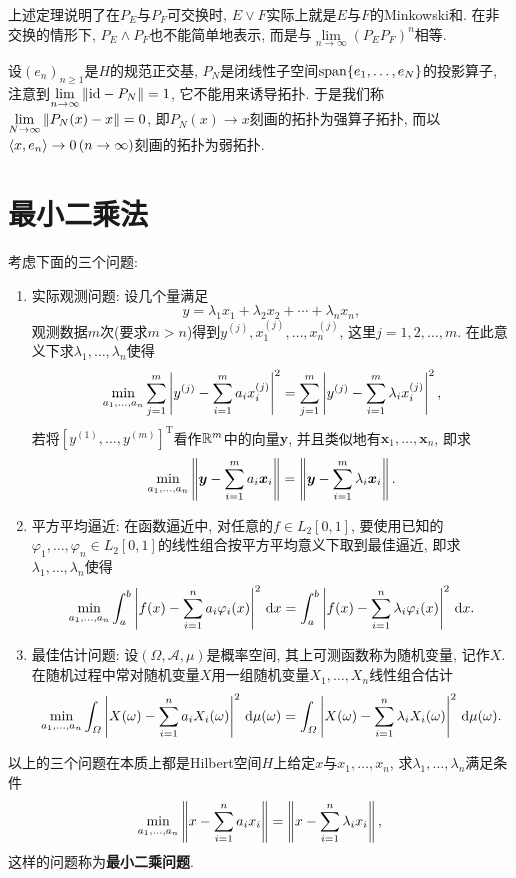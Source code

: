 	上述定理说明了在$ P_E $与$ P_F $可交换时, $ E\lor F $实际上就是$ E $与$ F $的Minkowski和. 在非交换的情形下, $ P_E\land P_F $也不能简单地表示, 而是与$ \lim\limits_{n\to\infty}(P_EP_F)^n $相等.
	
	设$ (e_n)_{n\geqslant 1} $是$ H $的规范正交基, $ P_N $是闭线性子空间$ \operatorname{span}\{ e_1,\dots,e_N \} $的投影算子, 注意到$ \lim\limits_{n\to\infty}\left\| \mathrm{id}-P_N \right\|=1 $, 它不能用来诱导拓扑. 于是我们称$ \lim\limits_{N\to\infty}\left\| P_N(x)-x \right\|=0 $, 即$ P_N(x)\to x $刻画的拓扑为强算子拓扑, 而以$ \left\langle x,e_n \right\rangle\to 0\,(n\to\infty) $刻画的拓扑为弱拓扑.
	
\section{最小二乘法}
	
	考虑下面的三个问题:
	\begin{enumerate}[(1)]
	\item 实际观测问题: 设几个量满足
	\[
	y=\lambda_1x_1+\lambda_2x_2+\cdots+\lambda_nx_n,
	\]
	观测数据$ m $次(要求$ m>n $)得到$ y^{(j)}, x_1^{(j)},\dots, x_n^{(j)} $, 这里$ j=1,2,\dots,m $. 在此意义下求$ \lambda_1,\dots,\lambda_n $使得
	\[
	\min_{a_1,\dots,a_n}\sum_{j=1}^m\left| y^{(j)}-\sum_{i=1}^ma_ix_i^{(j)} \right| ^2=\sum_{j=1}^m\left| y^{(j)}-\sum_{i=1}^m\lambda_ix_i^{(j)} \right| ^2,
	\]
	若将$ [y^{(1)},\dots,y^{(m)}]^\mathrm T $看作$ \mathbb{R}^m $中的向量$ \bm{y} $, 并且类似地有$ \bm{x}_1,\dots,\bm{x}_n $, 即求
	\[
	\min_{a_1,\dots,a_n}\left\| \bm y-\sum_{i=1}^ma_i\bm x_i \right\|=\left\| \bm y-\sum_{i=1}^m\lambda_i\bm x_i \right\|.
	\]
	\item 平方平均逼近: 在函数逼近中, 对任意的$ f\in L_2[0,1] $, 要使用已知的$ \varphi_1,\dots,\varphi_n\in L_2[0,1] $的线性组合按平方平均意义下取到最佳逼近, 即求$ \lambda_1,\dots,\lambda_n $使得
	\[
	\min_{a_1,\dots,a_n}\int_a^b\left| f(x)-\sum_{i=1}^na_i\varphi_i(x) \right| ^2\,\mathrm{d} x=\int_a^b\left| f(x)-\sum_{i=1}^n\lambda_i\varphi_i(x) \right| ^2\,\mathrm{d} x.
	\]
	\item 最佳估计问题: 设$ (\varOmega,\mathcal A,\mu) $是概率空间, 其上可测函数称为随机变量, 记作$ X $. 在随机过程中常对随机变量$ X $用一组随机变量$ X_1,\dots,X_n $线性组合估计
	\[
	\min_{a_1,\dots,a_n}\int_\varOmega\left| X(\omega)-\sum_{i=1}^na_iX_i(\omega) \right| ^2\,\mathrm{d}\mu(\omega)=\int_\varOmega\left| X(\omega)-\sum_{i=1}^n\lambda_iX_i(\omega) \right| ^2\,\mathrm{d}\mu(\omega).
	\]
	\end{enumerate}
	
	以上的三个问题在本质上都是Hilbert空间$ H $上给定$ x $与$ x_1,\dots,x_n $, 求$ \lambda_1,\dots,\lambda_n $满足条件
	\[
	\min_{a_1,\dots,a_n}\left\| x-\sum_{i=1}^na_ix_i \right\|=\left\| x-\sum_{i=1}^n\lambda_ix_i \right\|,
	\]
	这样的问题称为\textbf{最小二乘问题}.
	
